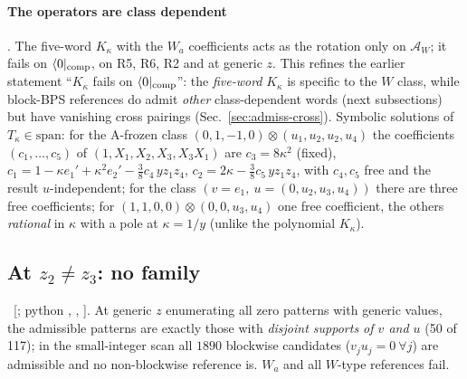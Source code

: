 \paragraph{The operators are class dependent} \ex. The five-word $K_\kappa$ with the $W_a$ coefficients acts as the rotation only on $\mathcal A_W$; it fails on $\langle0|_{\rm comp}$, on R5, R6, R2 and at generic $z$. This refines the earlier statement ``$K_\kappa$ fails on $\langle0|_{\rm comp}$'': the \emph{five-word} $K_\kappa$ is specific to the $W$ class, while block-BPS references do admit
\emph{other} class-dependent words (next subsections) but have vanishing cross pairings (Sec.~\ref{sec:admiss-cross}). Symbolic solutions of $T_\kappa\in\mathrm{span}$: for the A-frozen class $(0,1,-1,0)\otimes(u_1,u_2,u_2,u_4)$ the coefficients $(c_1,\dots,c_5)$ of $(1,X_1,X_2,X_3,X_3X_1)$ are
$c_3=8\kappa^2$ (fixed), $c_1=1-\kappa e_1'+\kappa^2e_2'-\tfrac38c_4\,yz_1z_4$, $c_2=2\kappa-\tfrac38c_5\,yz_1z_4$, with $c_4,c_5$ free and the result $u$-independent; for the class $(v=e_1,\ u=(0,u_2,u_3,u_4))$ there are three free coefficients; for $(1,1,0,0)\otimes(0,0,u_3,u_4)$ one free coefficient, the others \emph{rational} in $\kappa$ with a pole at $\kappa=1/y$ (unlike the polynomial $K_\kappa$).

\subsection{At $z_2\ne z_3$: no family}\label{sec:admiss-generic}

\ex\ [; python , , ]. At generic $z$ enumerating all zero patterns with generic values, the admissible patterns are exactly those with \emph{disjoint supports of $v$ and $u$} (50 of 117); in the small-integer scan all $1890$ blockwise candidates ($v_ju_j=0\ \forall j$) are admissible and no non-blockwise reference is. $W_a$ and all $W$-type references fail.
